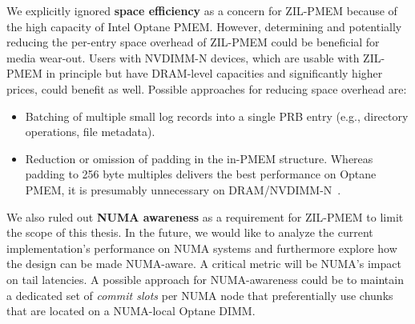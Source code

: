 \documentclass[12pt,a4paper,twoside]{book}
\begin{document}
We explicitly ignored \textbf{space efficiency} as a concern for ZIL-PMEM because of the high capacity of Intel Optane PMEM.
However, determining and potentially reducing the per-entry space overhead of ZIL-PMEM could be beneficial for media wear-out.
Users with NVDIMM-N devices, which are usable with ZIL-PMEM in principle but have DRAM-level capacities and significantly higher prices, could benefit as well.
Possible approaches for reducing space overhead are:
\begin{itemize}[noitemsep]
    \item Batching of multiple small log records into a single PRB entry (e.g., directory operations, file metadata).
    \item Reduction or omission of padding in the in-PMEM structure.
        Whereas padding to 256 byte multiples delivers the best performance on Optane PMEM, it is presumably unnecessary on DRAM/NVDIMM-N~\cite{yangEmpiricalGuideBehavior2020}.
\end{itemize}

We also ruled out \textbf{NUMA awareness} as a requirement for ZIL-PMEM to limit the scope of this thesis.
In the future, we would like to analyze the current implementation's performance on NUMA systems and furthermore explore how the design can be made NUMA-aware.
A critical metric will be NUMA's impact on tail latencies.
A possible approach for NUMA-awareness could be to maintain a dedicated set of \textit{commit slots} per NUMA node that preferentially use chunks that are located on a NUMA-local Optane DIMM.
\end{document}
